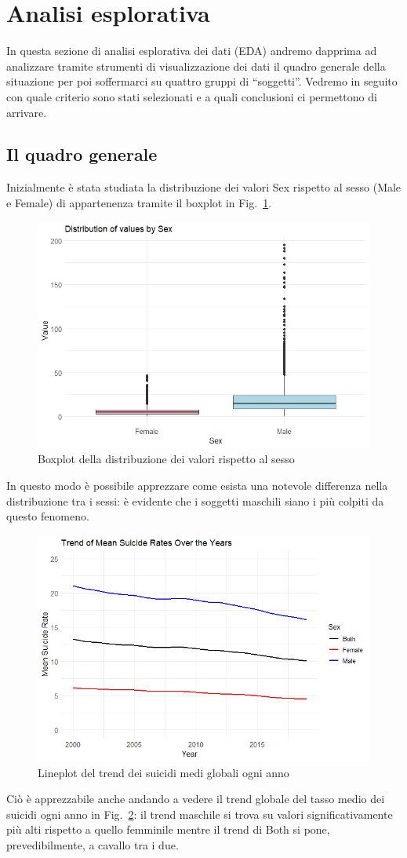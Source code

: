 \documentclass[conference]{IEEEtran}
\begin{document}
\section{Analisi esplorativa}

In questa sezione di analisi esplorativa dei dati (EDA) andremo dapprima
ad analizzare tramite strumenti di visualizzazione dei dati il quadro generale
della situazione per poi soffermarci su quattro gruppi di ``soggetti''.
Vedremo in seguito con quale criterio sono stati selezionati e a quali
conclusioni ci permettono di arrivare.

\subsection{Il quadro generale}

Inizialmente è stata studiata la distribuzione dei valori Sex rispetto
al sesso (Male e Female) di appartenenza tramite il boxplot in Fig.~\ref{1sex}.
\begin{figure}[htbp]
    \centerline{\includegraphics[width=.5\textwidth]{img/1 - Sex2.png}}
    \caption{Boxplot della distribuzione dei valori rispetto al sesso}
    \label{1sex}
\end{figure}
In questo modo è possibile apprezzare come esista una notevole differenza
nella distribuzione tra i sessi: è evidente che i soggetti maschili siano
i più colpiti da questo fenomeno.

\begin{figure}[htbp]
    \centerline{\includegraphics[width=.5\textwidth]{img/2 - Globtrend2.png}}
    \caption{Lineplot del trend dei suicidi medi globali ogni anno}
    \label{2globtrend}
\end{figure}
Ciò è apprezzabile anche andando a vedere il trend globale del
tasso medio dei suicidi ogni anno in Fig.~\ref{2globtrend}: il trend maschile
si trova su valori significativamente più alti rispetto a quello femminile mentre
il trend di Both si pone, prevedibilmente, a cavallo tra i due.
\end{document}
